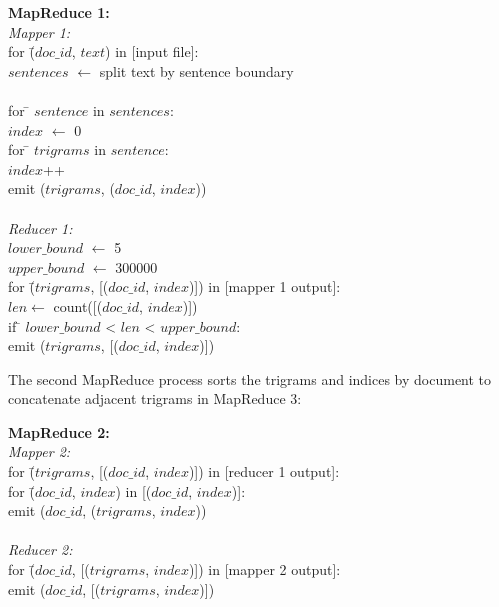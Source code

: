 \documentclass{sig-alternate}
\begin{document}
\begin{centering}

\begin{tabbing}
\textbf{MapReduce 1:}\\
\emph{Mapper 1:}\\

for \= ($doc\_id$, $text$) in [input file]:\\
\>	$sentences$  $\leftarrow$ split text by sentence boundary\\
\\
\>	for \= $sentence$ in $sentences$:\\
\>\>	$index$ $\leftarrow$ 0\\
\>\>	for \= $trigrams$ in $sentence$:\\
\>\>\>		$index$++	\\
\>\>\>		emit ($trigrams$, ($doc\_id$, $index$))\\
\\
\emph{Reducer 1:}\\
$lower\_bound$  $\leftarrow$ 5\\
$upper\_bound$  $\leftarrow$ 300000\\
for \= ($trigrams$, [($doc\_id$, $index$)]) in [mapper 1 output]:\\
\>	$len \leftarrow$ count([($doc\_id$, $index$)])\\
\> 	if \= $lower\_bound$ < $len$ < $upper\_bound$:\\
\>\>	emit ($trigrams$, [($doc\_id$, $index$)])\\
\end{tabbing}
\end{centering}

The second MapReduce process sorts the trigrams and indices by document to concatenate adjacent trigrams in MapReduce 3:

\begin{centering}
\begin{tabbing}
\textbf{MapReduce 2:}\\
\emph{Mapper 2:}\\
for \= ($trigrams$, [($doc\_id$, $index$)]) in [reducer 1 output]:\\
\>	for \= ($doc\_id$, $index$) in [($doc\_id$, $index$)]:\\
\>\> emit ($doc\_id$, ($trigrams$, $index$))\\
\\
\emph{Reducer 2:}\\
for \= ($doc\_id$, [($trigrams$, $index$)]) in [mapper 2 output]:\\
\>	emit ($doc\_id$, [($trigrams$, $index$)])

\end{tabbing}

\end{centering}
\end{document}
